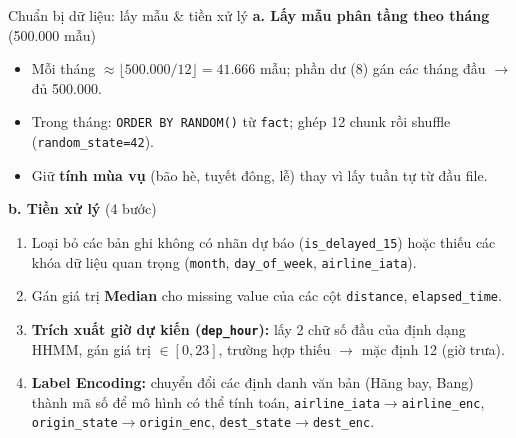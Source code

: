 \begin{frame}[shrink=5]{Chuẩn bị dữ liệu: lấy mẫu \& tiền xử lý}
\small
\textbf{a. Lấy mẫu phân tầng theo tháng} (500.000 mẫu)
\begin{itemize}\setlength\itemsep{0.15em}
  \item Mỗi tháng $\approx \lfloor 500{.}000/12\rfloor = 41{.}666$ mẫu; phần dư (8) gán các tháng đầu $\to$ đủ 500.000.
  \item Trong tháng: \texttt{ORDER BY RANDOM()} từ \texttt{fact}; ghép 12 chunk rồi shuffle (\texttt{random\_state=42}).
  \item Giữ \textbf{tính mùa vụ} (bão hè, tuyết đông, lễ) thay vì lấy tuần tự từ đầu file.
\end{itemize}

\vspace{1mm}
\textbf{b. Tiền xử lý} (4 bước)
\begin{enumerate}\setlength\itemsep{0.12em}
  \item Loại bỏ các bản ghi không có nhãn dự báo (\texttt{is\_delayed\_15}) hoặc thiếu các khóa dữ liệu quan trọng (\texttt{month}, \texttt{day\_of\_week}, \texttt{airline\_iata}).
  \item Gán giá trị \textbf{Median} cho missing value của các cột \texttt{distance}, \texttt{elapsed\_time}.
  \item \textbf{Trích xuất giờ dự kiến (\texttt{dep\_hour}):} lấy 2 chữ số đầu của định dạng HHMM, gán giá trị $\in [0,23]$, trường hợp thiếu $\to$ mặc định 12 (giờ trưa).
  \item \textbf{Label Encoding:} chuyển đổi các định danh văn bản (Hãng bay, Bang) thành mã số để mô hình có thể tính toán, \texttt{airline\_iata}$\to$\texttt{airline\_enc},
  \texttt{origin\_state}$\to$\texttt{origin\_enc}, \texttt{dest\_state}$\to$\texttt{dest\_enc}.
\end{enumerate}

\end{frame}


